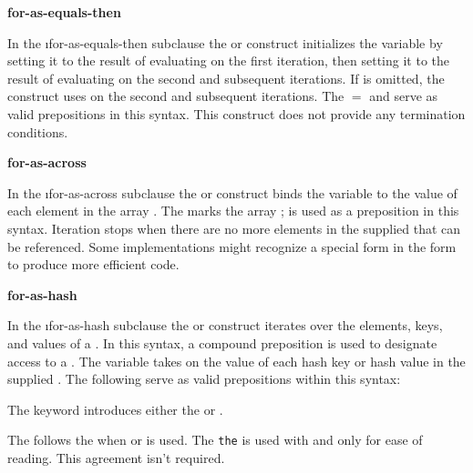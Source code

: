 {\bf for-as-equals-then}

In the \i{for-as-equals-then} subclause
the  
or  construct 
initializes the variable  by setting it to the
  result of evaluating  on the first iteration, then setting
  it to the result of evaluating  on the second and
  subsequent iterations.  If  is omitted, the construct
  uses  on the second and
  subsequent iterations.  
The  {$=$} and  serve as valid prepositions
in this syntax. 
This construct does not provide any termination conditions.
 
{\bf for-as-across}

  In the \i{for-as-across} subclause the  
  or  construct binds the variable  to the value of
  each element in the array .
  The   marks the array ; 
  is used as a preposition in this syntax.
  Iteration stops when there are no more elements in the supplied
   that can be referenced.
  Some implementations might recognize a  special form
  in the  form to produce more efficient code.
 
{\bf for-as-hash}

  In the \i{for-as-hash} subclause
  the  
  or  construct 
  iterates over the elements, keys, and values of a .
  In this syntax, a compound preposition is used to designate access to a
  .
  The variable  takes on the value of each hash key
  or hash value in the supplied . 
  The following  serve as valid prepositions within this syntax:
 
\beginlist
 
             
The keyword  introduces either the {\LoopSchema} 
 or .
 
 
The  
follows the   when  or
 is used.  The  {\tt the} is used with
 and  only for ease of reading.
This agreement isn't required.
 
